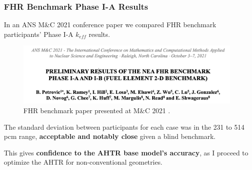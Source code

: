 \begin{frame}
    \frametitle{FHR Benchmark Phase I-A Results}
    In an ANS M$\&$C 2021 conference paper we compared FHR benchmark participants' 
    Phase I-A $k_{eff}$ results. 
    \begin{figure}[]
        \centering
        \includegraphics[width=0.85\linewidth]{figures/mnc.png} 
        \caption{FHR benchmark paper presented at M$\&$C 2021 
        \cite{petrovic_preliminary_2021}.}
    \end{figure}

    The standard deviation between participants for each case was in the 231 to 514 
    pcm range, \textbf{acceptable and notably close} given a blind benchmark.

    \vspace{0.2cm}
    This gives \textbf{confidence to the AHTR base model's accuracy}, as I 
    proceed to optimize the AHTR for non-conventional geometries. 
\end{frame}
